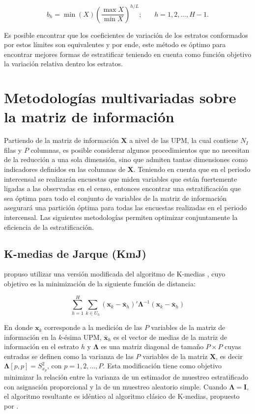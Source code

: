 \documentclass[
  12pt,
]{book}
\begin{document}
\[
b_h = \min(X) \left( \frac{\max X}{\min X} \right) ^ {h/L}; \ \ \ \ \ \ \ \ h = 1, 2, \ldots, H-1.
\]

Es posible encontrar que los coeficientes de variación de los estratos conformados por estos límites son equivalentes y por ende, este método es óptimo para encontrar mejores formas de estratificar teniendo en cuenta como función objetivo la variación relativa dentro los estratos.

\hypertarget{metodologuxedas-multivariadas-sobre-la-matriz-de-informaciuxf3n}{%
\section{Metodologías multivariadas sobre la matriz de información}\label{metodologuxedas-multivariadas-sobre-la-matriz-de-informaciuxf3n}}

Partiendo de la matriz de información \(\mathbf{X}\) a nivel de las UPM, la cual contiene \(N_I\) filas y \(P\) columnas, es posible considerar algunos procedimientos que no necesitan de la reducción a una sola dimensión, sino que admiten tantas dimensiones como indicadores definidos en las columnas de \(\mathbf{X}\). Teniendo en cuenta que en el periodo intercensal se realizarán encuestas que miden variables que están fuertemente ligadas a las observadas en el censo, entonces encontrar una estratificación que sea óptima para todo el conjunto de variables de la matriz de información asegurará una partición óptima para todas las encuestas realizadas en el periodo intercensal. Las siguientes metodologías permiten optimizar conjuntamente la eficiencia de la estratificación.

\hypertarget{k-medias-de-jarque-kmj}{%
\subsection{K-medias de Jarque (KmJ)}\label{k-medias-de-jarque-kmj}}

\citet{Jarque_1981} propuso utilizar una versión modificada del algoritmo de K-medias \citep{Macqueen_1967}, cuyo objetivo es la minimización de la siguiente función de distancia:

\[
\sum_{h=1}^H \sum_{k\in U_h}(\mathbf x_k - \bar {\mathbf x}_h)'\boldsymbol \Lambda^{-1}(\mathbf x_k - \bar {\mathbf x}_h)
\]

En donde \(\mathbf x_k\) corresponde a la medición de las \(P\) variables de la matriz de información en la \(k\)-ésima UPM, \(\bar {\mathbf x}_h\) es el vector de medias de la matriz de información en el estrato \(h\) y \(\boldsymbol \Lambda\) es una matriz diagonal de tamaño \(P \times P\) cuyas entradas se definen como la varianza de las \(P\) variables de la matriz \(\mathbf X\), es decir \(\boldsymbol \Lambda [p,p]=S^2_{x_p}\), con \(p = 1, 2, \ldots, P\). Esta modificación tiene como objetivo minimizar la relación entre la varianza de un estimador de muestreo estratificado con asignación proporcional y la de un muestreo aleatorio simple. Cuando \(\boldsymbol \Lambda = \mathbf I\), el algoritmo resultante es idéntico al algoritmo clásico de K-medias, propuesto por \citet{Macqueen_1967}.
\end{document}
